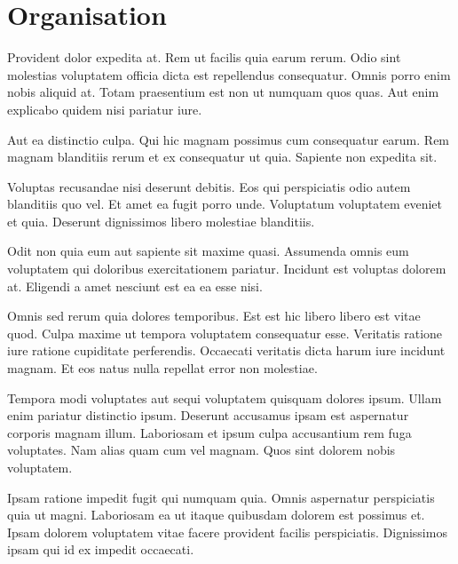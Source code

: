 \documentclass[a4paper]{article}
\begin{document}
\clearpage
{}
\nocite{coursera}
\nocite{caltech}
\nocite{python}
\nocite{pydoc}
\nocite{ml-intro}
\nocite{gb-tuto}
\nocite{nn-tuto}



\clearpage
\section*{Organisation}

\begin{multicols}{2}

Provident dolor expedita at. Rem ut facilis quia earum rerum. Odio sint
    molestias voluptatem officia dicta est repellendus consequatur. Omnis porro
    enim nobis aliquid at. Totam praesentium est non ut numquam quos quas. Aut
    enim explicabo quidem nisi pariatur iure.

Aut ea distinctio culpa. Qui hic magnam possimus cum consequatur earum. Rem
    magnam blanditiis rerum et ex consequatur ut quia. Sapiente non expedita
    sit.

Voluptas recusandae nisi deserunt debitis. Eos qui perspiciatis odio autem
    blanditiis quo vel. Et amet ea fugit porro unde. Voluptatum voluptatem
    eveniet et quia. Deserunt dignissimos libero molestiae blanditiis.

Odit non quia eum aut sapiente sit maxime quasi. Assumenda omnis eum voluptatem
    qui doloribus exercitationem pariatur. Incidunt est voluptas dolorem at.
    Eligendi a amet nesciunt est ea ea esse nisi.

Omnis sed rerum quia dolores temporibus. Est est hic libero libero est vitae
    quod. Culpa maxime ut tempora voluptatem consequatur esse. Veritatis ratione
    iure ratione cupiditate perferendis. Occaecati veritatis dicta harum iure
    incidunt magnam. Et eos natus nulla repellat error non molestiae.

Tempora modi voluptates aut sequi voluptatem quisquam dolores ipsum. Ullam enim
    pariatur distinctio ipsum. Deserunt accusamus ipsam est aspernatur corporis
    magnam illum. Laboriosam et ipsum culpa accusantium rem fuga voluptates. Nam
    alias quam cum vel magnam. Quos sint dolorem nobis voluptatem.

Ipsam ratione impedit fugit qui numquam quia. Omnis aspernatur perspiciatis quia
    ut magni. Laboriosam ea ut itaque quibusdam dolorem est possimus et. Ipsam
    dolorem voluptatem vitae facere provident facilis perspiciatis. Dignissimos
    ipsam qui id ex impedit occaecati.


\end{multicols}
\end{document}
